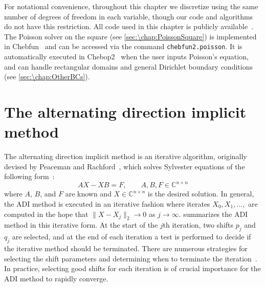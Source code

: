 For notational convenience, throughout this chapter we discretize using the same number of degrees of freedom in each variable, though our code and algorithms do not have this restriction. All code used in this chapter is publicly available~\cite{GithubRepoPoisson}. The Poisson solver on the square (see \cref{sec:\chap:PoissonSquare}) is implemented in Chebfun~\cite{Chebfun, Townsend_13_01} and can be accessed via the command {\tt chebfun2.poisson}. It is automatically executed in Chebop2~\cite{Townsend_15_01} when the user inputs Poisson's equation, and can handle rectangular domains and general Dirichlet boundary conditions (see \cref{sec:\chap:OtherBCs}).

\section{The alternating direction implicit method}
\label{sec:\chap:ADIMethod}
The alternating direction implicit method is an iterative algorithm, originally devised by Peaceman and Rachford~\cite{Peaceman_55_01}, which solves Sylvester equations of the following form~\cite{Lu_91_01}:
\begin{equation}
A X - XB = F, \qquad A, B, F\in\mathbb{C}^{n\times n}
\label{eq:\chap:SylvesterEquation} 
\end{equation} 
where $A$, $B$, and $F$ are known and $X\in\mathbb{C}^{n\times n}$ is the desired solution. In general, the ADI method is executed in an iterative fashion where iterates $X_0,X_1,\ldots,$ are computed in the hope that $\|X-X_j\|_2 \rightarrow 0$ as $j\rightarrow \infty$.  summarizes the ADI method in this iterative form. At the start of the $j$th iteration, two shifts $p_j$ and $q_j$ are selected, and at the end of each iteration a test is performed to decide if the iterative method should be terminated. There are numerous strategies for selecting the shift parameters and determining when to terminate the iteration~\cite{Sabino_07_01}. In practice, selecting good shifts for each iteration is of crucial importance for the ADI method to rapidly converge.

